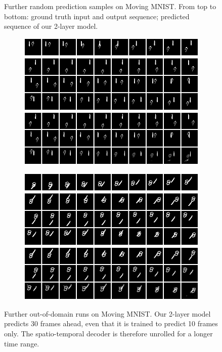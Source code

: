 \begin{figure}[htpb]
\begin{subfigure}{0.49\textwidth}
  \caption{}
  \label{fig:mm-pred-random4}
\end{subfigure}
\caption[Random Prediction Samples on Moving MNIST]{Further random prediction samples on Moving MNIST. From top to bottom: ground truth input and output sequence; predicted sequence of our 2-layer model.} \label{fig:mm-pred-random}
\end{figure}

\begin{figure}[htpb]
\centering
\begin{subfigure}{0.5\textwidth}
  \centering
  \includegraphics[width=0.9\linewidth]{figures/pred/mm/long/prediction-00.png}
  \caption{}
  \label{fig:mm-pred-long1}
\end{subfigure}%
\begin{subfigure}{0.5\textwidth}
  \centering
  \includegraphics[width=0.9\linewidth]{figures/pred/mm/long/prediction-07.png}
  \caption{}
  \label{fig:mm-pred-long2}
\end{subfigure}
\caption[Long-Term Prediction on Moving MNIST]{Further out-of-domain runs on Moving MNIST. Our 2-layer model predicts 30 frames ahead, even that it is trained to predict 10 frames only. The spatio-temporal decoder is therefore unrolled for a longer time range.} \label{fig:mm-pred-long}
\end{figure}

